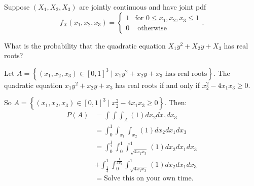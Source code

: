 \begin{example}
	Suppose $\left( X_1, X_2, X_3 \right) $ are jointly continuous and have joint pdf 
	\[
		f_{X}\left( x_1, x_2, x_3 \right)  = \begin{cases}
			1 & \text{for } 0 \le x_1, x_2, x_3 \le 1\\
			0 & \text{ otherwise}
		\end{cases}
	.\] 

	What is the probability that the quadratic equation $X_1 y^{2} + X_2 y + X_3 $ has real roots?

	Let $A = \left\{ \left( x_1, x_2, x_3 \right) \in  \left[ 0,1 \right] ^3 \mid x_1 y^{2} + x_2 y + x_3 \text{  has real roots} \right\}$. The quadratic equation $x_1 y^2 + x_2 y + x_3$ has real roots if and only if $x_2^2 - 4x_1 x_3 \ge 0$. 

	So $A = \left\{ \left( x_1, x_2, x_3 \right) \in  \left[ 0,1 \right] ^3 \mid x_2 ^2 - 4 x_1 x_3 \ge 0 \right\}$. Then:
	\begin{align*}
		P\left( A  \right) &= \int\int\int_{A} \left( 1 \right) dx_2 dx_1 dx_3  \\
				   &= \int_{0}^{1} \int_{x_1}\int_{x_2} \left( 1 \right) dx_2 dx_1 dx_3 \\
				   &= \int_{0}^{\frac{1}{4}} \int_{0}^{1} \int_{\sqrt{4 x_1 x_3} }^{1} \left( 1 \right) dx_2 dx_1 dx_3     \\
				   &+ \int_{\frac{1}{4}}^{1} \int_{0}^{\frac{1}{4x_3}} \int_{\sqrt{4 x_1 x_3} }^{1} \left( 1 \right) dx_2 dx_1 dx_3 \\
				   &= \text{Solve this on your own time} 
	.\end{align*}
\end{example}
